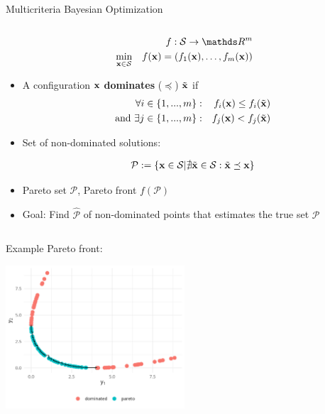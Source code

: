 \documentclass[11pt,compress,t,notes=noshow, xcolor=table]{beamer}
\begin{document}
\begin{vbframe}{Multicriteria Bayesian Optimization}
\begin{columns}
\begin{column}{0.60\textwidth}
\begin{eqnarray*}
  && f: \mathcal{S} \rightarrow \R^m\\
  \min \limits_{\xv \in \mathcal{S}} && f(\xv) = \left(f_1(\xv), \ldots, f_m(\xv)\right)
\end{eqnarray*}
\begin{itemize}
  \item A configuration $\mathbf{x}$ \textbf{dominates} ($\preceq$) $\tilde{\mathbf{x}}$ if
\begin{eqnarray*}
  \forall i \in \{ 1, ..., m\}: && f_i(\mathbf{x}) \leq f_i(\tilde{\mathbf{x}})\\
  \text{and}~\exists j \in \{1, ..., m\}: && f_j(\mathbf{x}) < f_j(\tilde{\mathbf{x}})
\end{eqnarray*}
\item Set of non-dominated solutions:
  \begin{small}
  \begin{align*}
    \mathcal{P} := \{\mathbf{x} \in \mathcal{S} | \nexists \tilde{\mathbf{x}} \in \mathcal{S}: \tilde{\mathbf{x}} \preceq \mathbf{x} \}
\end{align*}
\end{small}
\item Pareto set $\mathcal{P}$, Pareto front $ f(\mathcal{P})$
\item{Goal:} Find $\hat{\mathcal{P}}$ of non-dominated points that estimates the true set $\mathcal{P}$
\end{itemize}
\end{column}
\end{columns}

\framebreak

Example Pareto front:

\vspace{+0.45cm}
\begin{center}
  \includegraphics[width = 0.5\textwidth]{figure_man/multicrit_0.png}
\end{center}
\end{vbframe}
\end{document}
